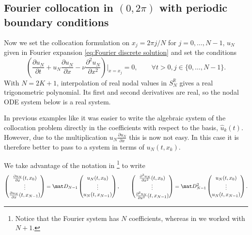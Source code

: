 \subsection{Fourier collocation in $(0,2\pi)$ with periodic boundary conditions}
Now we set the collocation formulation on $x_j = 2 \pi j / N$ for $j = 0, \dots, N-1$, $u_N$ given in Fourier expansion \eqref{eq:Fourier discrete solution}
and set the conditions
\begin{equation*}
    \left( \frac{\partial u_N}{\partial t} + u_N \frac{\partial u_N}{\partial x} - \nu \frac{\partial^2 u_N}{\partial x^2} \right)\Bigg|_{x = x_j} = 0 , \qquad \forall t > 0, j \in \{0,\dots, N-1\}.
\end{equation*}
With $N=2K+1$, interpolation of real nodal values in $S_N^{\mathbb R}$ gives a real trigonometric polynomial. Its first and second derivatives are real, so the nodal ODE system below is a real system.
\begin{remark}
    \label{rem:collocation solve in point-values}
    In previous examples like  it was easier to write the algebraic system of the collocation problem directly in the coefficients with respect to the basis, $\hat u_k(t)$.
    However, due to the multiplication $u_N \frac{\partial u_N}{\partial x}$ this is now not easy. In this case it is therefore better to pass to a system in terms of $u_N(t, x_k)$.
\end{remark}
We take advantage of the notation in \footnote{Notice that the Fourier system has $N$ coefficients, whereas in  we worked with $N+1$.}
to write
\begin{equation*}
    \begin{pmatrix}
        \frac{\partial u_N}{\partial x}(t,x_0) \\ \vdots \\ \frac{\partial u_N}{\partial x} (t, x_{N-1})
    \end{pmatrix}
    =
    \mat D_{N-1}
    \begin{pmatrix}
        u_N(t,x_0) \\ \vdots \\ u_N(t,x_{N-1})
    \end{pmatrix},
    \qquad
    \begin{pmatrix}
        \frac{\partial^2 u_N}{\partial x^2}(t,x_0) \\ \vdots \\ \frac{\partial^2 u_N}{\partial x^2} (t, x_{N-1})
    \end{pmatrix}
    =
    \mat D_{N-1}^2
    \begin{pmatrix}
        u_N(t,x_0) \\ \vdots \\ u_N(t,x_{N-1})
    \end{pmatrix}.
\end{equation*}
